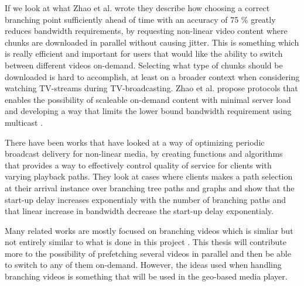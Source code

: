 If we look at what Zhao et al. \cite{scalableOnDemand} wrote they describe how choosing a correct branching point sufficiently ahead of time with an accuracy of 75 \% greatly reduces bandwidth requirements, by requesting non-linear video content where chunks are downloaded in parallel without causing jitter. This is something which is really efficient and important for users that would like the ability to switch between different videos on-demand. Selecting what type of chunks should be downloaded is hard to accomplish, at least on a broader context when considering watching TV-streams during TV-broadcasting. Zhao et al. \cite{scalableOnDemand} propose protocols that enables the possibility of scaleable on-demand content with minimal server load and developing a way that limits the lower bound bandwidth requirement using multicast \cite{scalableOnDemand}. 


There have been works that have looked at a way of optimizing periodic broadcast delivery for non-linear media, by creating functions and algorithms that provides a way to effectively control quality of service for clients with varying playback paths. They look at cases where clients makes a path selection at their arrival instance over branching tree paths and graphs and show that the start-up delay increases exponentialy with the number of branching paths and that linear increase in bandwidth decrease the start-up delay exponentialy\cite{optimizedbroadcast}.

Many related works are mostly focused on branching videos which is simliar but not entirely similar to what is done in this project \cite{qualbranch, hasmultipath,scalableOnDemand}. This thesis will contribute more to the possibility of prefetching several videos in parallel and then be able to switch to any of them on-demand. However, the ideas used when handling branching videos is something that will be used in the geo-based media player.

